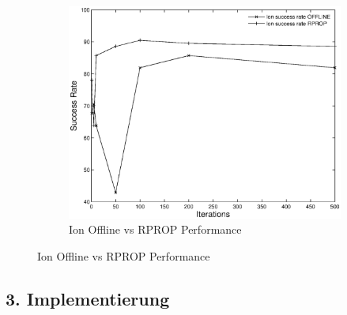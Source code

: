 \documentclass{article}
\begin{document}
	\begin{figure}[H]
	  \begin{subfigure}
	    \centering
	    \includegraphics[scale=0.75]{task2-ion-1.eps}
      \caption{Ion Offline vs RPROP Performance}
	  \end{subfigure}
	\end{figure}

\subsection*{3. Implementierung}


\end{document}
